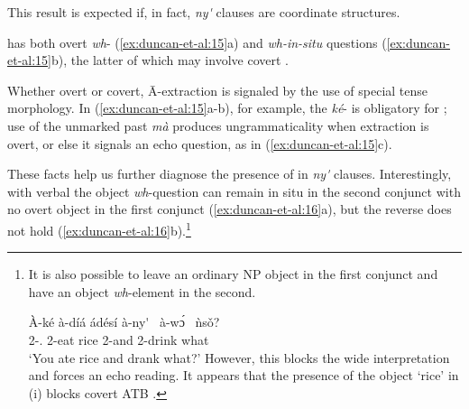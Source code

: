 \documentclass[output=paper
,newtxmath
,modfonts
,nonflat]{langsci/langscibook}
\begin{document}
\noindent This result is expected if, in fact, \textit{ny\'{\textturnv}\ng} clauses are coordinate structures.

 has both overt \textit{wh}- (\ref{ex:duncan-et-al:15}a) and \textit{wh-in-situ} questions (\ref{ex:duncan-et-al:15}b), the latter of which may involve covert .

\ea\label{ex:duncan-et-al:15}
\z
\z

\noindent Whether overt or covert, \={A}-extraction is signaled by the use of special  tense morphology. In (\ref{ex:duncan-et-al:15}a-b), for example, the  \textit{k\'{e}}- is obligatory for ; use of the unmarked past  \textit{m\`{a}} produces ungrammaticality when extraction is overt, or else it signals an echo question, as in (\ref{ex:duncan-et-al:15}c).

These facts help us further diagnose the presence of  in \textit{ny\'{\textturnv}\ng} clauses. Interestingly, with verbal  the object \textit{wh}-question can remain {in situ} in the second conjunct with no overt object in the first conjunct (\ref{ex:duncan-et-al:16}a), but the reverse does not hold (\ref{ex:duncan-et-al:16}b).\footnote{It is also possible to leave an ordinary NP object in the first conjunct and have an object \textit{wh}-element in the second.

\ea\label{ex:duncan-et-al:i}
\gll \`{A}-k\'{e} \`{a}-d\'{i}\'{a} \'{a}d\'{e}s\'{i} \`{a}-ny\'{\textturnv}\ng~ \`{a}-\ng w\'ɔ\ng~ \`{n}s\v{o}? \\
2{\sg-\pst.\foc} 2{\sg}-eat rice 2{\sg}-and 2{\sg}-drink what \\
\glt `You ate rice and drank what?'
\z
However, this blocks the wide  interpretation and forces an echo reading. It appears that the presence of the object `rice' in (i) blocks covert ATB .}
\end{document}
